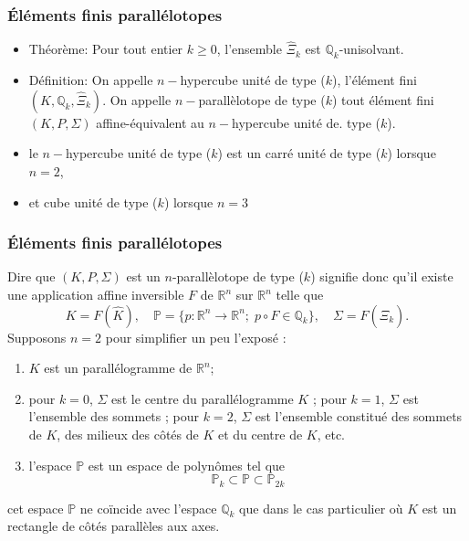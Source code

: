 \documentclass{beamer}
\begin{document}
\begin{frame}
\frametitle{Éléments finis parallélotopes}

\begin{itemize}
\item Théorème: Pour tout entier $k\geq 0$, l'ensemble $\widehat{\Xi}_k$ est $\mathbb{Q}_k$-unisolvant.
\item Définition: On appelle $n-$hypercube unité de type ($k$),  l'élément fini $(K, \mathbb{Q}_k, \widehat{\Xi}_k)$. On appelle $n-$parallèlotope de type ($k$) tout élément fini $(K, P, \Sigma)$ affine-équivalent au $n-$hypercube unité de. type ($k$).
\item le $n-$hypercube unité de type ($k$) est un carré unité de type ($k$) lorsque $n=2$, 
\item et cube unité de type ($k$) lorsque $n = 3$
\end{itemize}
\end{frame}
\begin{frame}
\frametitle{Éléments finis parallélotopes}
Dire que $(K, P, \Sigma)$ est un $n$-parallèlotope de type 
($k$) signifie donc qu'il existe une application affine inversible $F$ de $\mathbb{R}^n$ sur $\mathbb{R}^n$ telle que
\begin{equation}
K=F(\widehat{K}),\quad \mathbb{P}=\{p: \mathbb{R}^n\to \mathbb{R}^n;\; p\circ F\in \mathbb{Q}_k\},\quad \Sigma=F(\widehat{\Xi}_k).
\end{equation}
Supposons $n=2$ pour simplifier un peu l'exposé :
\begin{enumerate}
\item $K$ est un parallélogramme de $\mathbb{R}^n$;
\item pour $k=0$, $\Sigma$ est le centre du parallélogramme $K$ ; pour $k =1$, $\Sigma$ est l'ensemble des sommets ; pour $k =2$, $\Sigma$ est l'ensemble constitué des sommets de $K$, des milieux des côtés de $K$ et du centre de $K$, etc.
\item l'espace $\mathbb{P}$ est un espace de polynômes tel que
\[\mathbb{P}_k\subset \mathbb{P}\subset \mathbb{P}_{2k}\]
\end{enumerate}

cet espace $\mathbb{P}$ ne coïncide avec l'espace $\mathbb{Q}_k$ que dans le cas particulier où $K$ est un rectangle de côtés parallèles aux axes.
\end{frame}
\end{document}
